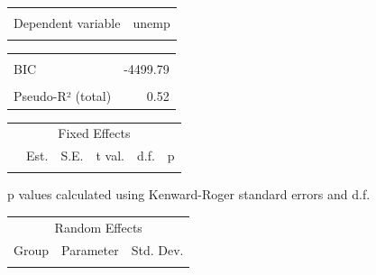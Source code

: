 \documentclass[
  letterpaper,
  DIV=11,
  numbers=noendperiod,
  oneside]{scrreprt}
\begin{document}
\begin{table}[!h]
\centering
\begin{tabular}{lr}
\toprule
\cellcolor{gray!10}{Observations} & \cellcolor{gray!10}{1584}\\
Dependent variable & unemp\\
\cellcolor{gray!10}{Type} & \cellcolor{gray!10}{Mixed effects linear regression}\\
\bottomrule
\end{tabular}
\end{table} \begin{table}[!h]
\centering
\begin{tabular}{lr}
\toprule
\cellcolor{gray!10}{AIC} & \cellcolor{gray!10}{-4521.26}\\
BIC & -4499.79\\
\cellcolor{gray!10}{Pseudo-R² (fixed effects)} & \cellcolor{gray!10}{0.00}\\
Pseudo-R² (total) & 0.52\\
\bottomrule
\end{tabular}
\end{table} \begin{table}[!h]
\centering
\begin{threeparttable}
\begin{tabular}{lrrrrr}
\toprule
\multicolumn{6}{c}{Fixed Effects} \\
\cmidrule(l{3pt}r{3pt}){1-6}
  & Est. & S.E. & t val. & d.f. & p\\
\midrule
\cellcolor{gray!10}{(Intercept)} & \cellcolor{gray!10}{0.12} & \cellcolor{gray!10}{0.01} & \cellcolor{gray!10}{18.63} & \cellcolor{gray!10}{59.98} & \cellcolor{gray!10}{0.00}\\
\bottomrule
\end{tabular}
\begin{tablenotes}
\item  p values calculated using Kenward-Roger standard errors and d.f. 
\end{tablenotes}
\end{threeparttable}
\end{table} \begin{table}[!h]
\centering
\begin{tabular}{lll}
\toprule
\multicolumn{3}{c}{Random Effects} \\
\cmidrule(l{3pt}r{3pt}){1-3}
Group & Parameter & Std. Dev.\\
\midrule
\cellcolor{gray!10}{lsoa\_cd:msoa\_cd} & \cellcolor{gray!10}{(Intercept)} & \cellcolor{gray!10}{0.03}\\

\end{tabular}
\end{table}
\end{document}
